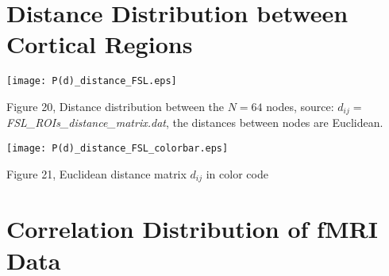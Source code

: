 \documentclass{article}
\begin{document}
\section{Distance Distribution between Cortical Regions}
\begin{center}
    \texttt{[image: P(d)\_distance\_FSL.eps]} 
	\newline
\begin{footnotesize}
 Figure 20, Distance distribution between the $N=64$ nodes, source: $d_{ij}=$\textit{FSL\_ROIs\_distance\_matrix.dat}, the distances between nodes are Euclidean.
\end{footnotesize}
\end{center}

\begin{center}
    \texttt{[image: P(d)\_distance\_FSL\_colorbar.eps]} 
	\newline
\begin{footnotesize}
 Figure 21, Euclidean distance matrix $d_{ij}$ in color code
\end{footnotesize}
\end{center}

\section{Correlation Distribution of fMRI Data}
\end{document}
